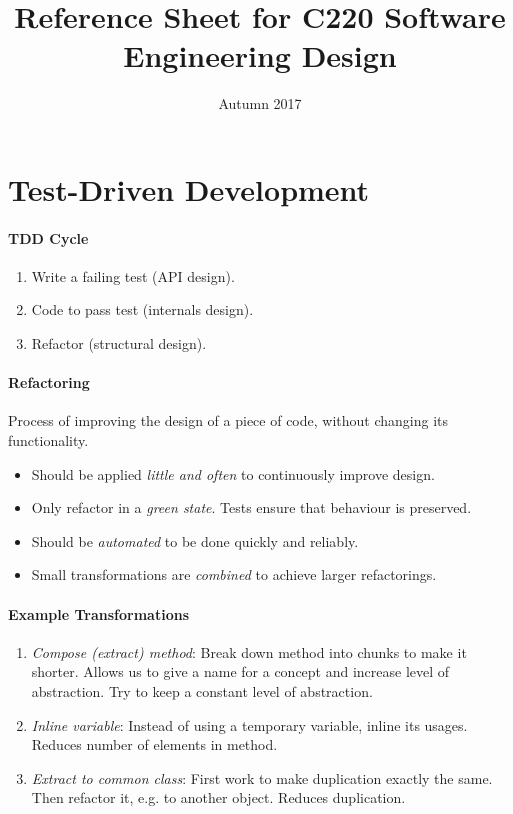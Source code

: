\documentclass[twocolumn,english]{article}
\begin{document}
\title{Reference Sheet for C220 Software Engineering Design}

\date{Autumn 2017}
\maketitle

\section{Test-Driven Development}

\paragraph{TDD Cycle}
\begin{enumerate}
\item Write a failing test (API design).
\item Code to pass test (internals design).
\item Refactor (structural design).
\end{enumerate}

\paragraph{Refactoring}

Process of improving the design of a piece of code, without changing
its functionality.
\begin{itemize}
\item Should be applied \emph{little and often} to continuously improve
design.
\item Only refactor in a \emph{green state}. Tests ensure that behaviour
is preserved.
\item Should be \emph{automated} to be done quickly and reliably.
\item Small transformations are \emph{combined} to achieve larger refactorings.
\end{itemize}

\paragraph{Example Transformations}
\begin{enumerate}
\item \emph{Compose (extract) method}: Break down method into chunks to
make it shorter. Allows us to give a name for a concept and increase
level of abstraction. Try to keep a constant level of abstraction.
\item \emph{Inline variable}: Instead of using a temporary variable, inline
its usages. Reduces number of elements in method.
\item \emph{Extract to common class}: First work to make duplication exactly
the same. Then refactor it, e.g. to another object. Reduces duplication.
\end{enumerate}
\end{document}
